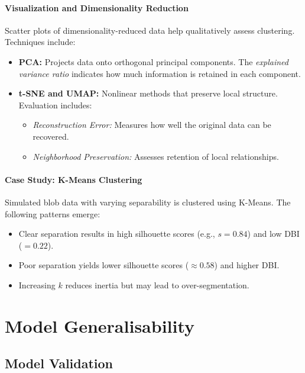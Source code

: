 \documentclass[9pt]{extarticle}
\begin{document}
\paragraph{Visualization and Dimensionality Reduction}

Scatter plots of dimensionality-reduced data help qualitatively assess clustering. Techniques include:
\begin{itemize}
    \item \textbf{PCA:} Projects data onto orthogonal principal components. The \textit{explained variance ratio} indicates how much information is retained in each component.
    \item \textbf{t-SNE and UMAP:} Nonlinear methods that preserve local structure. Evaluation includes:
        \begin{itemize}
            \item \textit{Reconstruction Error:} Measures how well the original data can be recovered.
            \item \textit{Neighborhood Preservation:} Assesses retention of local relationships.
        \end{itemize}
\end{itemize}

\paragraph{Case Study: K-Means Clustering}

Simulated blob data with varying separability is clustered using K-Means. The following patterns emerge:
\begin{itemize}
    \item Clear separation results in high silhouette scores (e.g., $s = 0.84$) and low DBI ($= 0.22$).
    \item Poor separation yields lower silhouette scores ($\approx 0.58$) and higher DBI.
    \item Increasing $k$ reduces inertia but may lead to over-segmentation.
\end{itemize}





\section{Model Generalisability}

\subsection{Model Validation}
\end{document}
